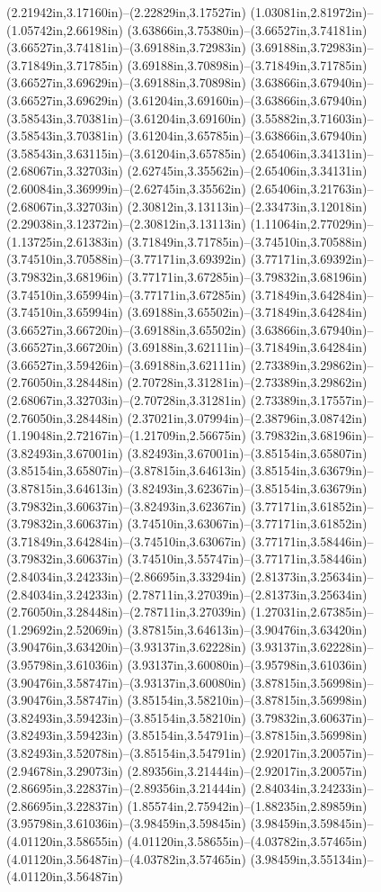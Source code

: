 (2.21942in,3.17160in)--(2.22829in,3.17527in) (1.03081in,2.81972in)--(1.05742in,2.66198in) (3.63866in,3.75380in)--(3.66527in,3.74181in) (3.66527in,3.74181in)--(3.69188in,3.72983in) (3.69188in,3.72983in)--(3.71849in,3.71785in) (3.69188in,3.70898in)--(3.71849in,3.71785in) (3.66527in,3.69629in)--(3.69188in,3.70898in) (3.63866in,3.67940in)--(3.66527in,3.69629in) (3.61204in,3.69160in)--(3.63866in,3.67940in) (3.58543in,3.70381in)--(3.61204in,3.69160in) (3.55882in,3.71603in)--(3.58543in,3.70381in) (3.61204in,3.65785in)--(3.63866in,3.67940in) (3.58543in,3.63115in)--(3.61204in,3.65785in) (2.65406in,3.34131in)--(2.68067in,3.32703in) (2.62745in,3.35562in)--(2.65406in,3.34131in) (2.60084in,3.36999in)--(2.62745in,3.35562in) (2.65406in,3.21763in)--(2.68067in,3.32703in) (2.30812in,3.13113in)--(2.33473in,3.12018in) (2.29038in,3.12372in)--(2.30812in,3.13113in) (1.11064in,2.77029in)--(1.13725in,2.61383in) (3.71849in,3.71785in)--(3.74510in,3.70588in) (3.74510in,3.70588in)--(3.77171in,3.69392in) (3.77171in,3.69392in)--(3.79832in,3.68196in) (3.77171in,3.67285in)--(3.79832in,3.68196in) (3.74510in,3.65994in)--(3.77171in,3.67285in) (3.71849in,3.64284in)--(3.74510in,3.65994in) (3.69188in,3.65502in)--(3.71849in,3.64284in) (3.66527in,3.66720in)--(3.69188in,3.65502in) (3.63866in,3.67940in)--(3.66527in,3.66720in) (3.69188in,3.62111in)--(3.71849in,3.64284in) (3.66527in,3.59426in)--(3.69188in,3.62111in) (2.73389in,3.29862in)--(2.76050in,3.28448in) (2.70728in,3.31281in)--(2.73389in,3.29862in) (2.68067in,3.32703in)--(2.70728in,3.31281in) (2.73389in,3.17557in)--(2.76050in,3.28448in) (2.37021in,3.07994in)--(2.38796in,3.08742in) (1.19048in,2.72167in)--(1.21709in,2.56675in) (3.79832in,3.68196in)--(3.82493in,3.67001in) (3.82493in,3.67001in)--(3.85154in,3.65807in) (3.85154in,3.65807in)--(3.87815in,3.64613in) (3.85154in,3.63679in)--(3.87815in,3.64613in) (3.82493in,3.62367in)--(3.85154in,3.63679in) (3.79832in,3.60637in)--(3.82493in,3.62367in) (3.77171in,3.61852in)--(3.79832in,3.60637in) (3.74510in,3.63067in)--(3.77171in,3.61852in) (3.71849in,3.64284in)--(3.74510in,3.63067in) (3.77171in,3.58446in)--(3.79832in,3.60637in) (3.74510in,3.55747in)--(3.77171in,3.58446in) (2.84034in,3.24233in)--(2.86695in,3.33294in) (2.81373in,3.25634in)--(2.84034in,3.24233in) (2.78711in,3.27039in)--(2.81373in,3.25634in) (2.76050in,3.28448in)--(2.78711in,3.27039in) (1.27031in,2.67385in)--(1.29692in,2.52069in) (3.87815in,3.64613in)--(3.90476in,3.63420in) (3.90476in,3.63420in)--(3.93137in,3.62228in) (3.93137in,3.62228in)--(3.95798in,3.61036in) (3.93137in,3.60080in)--(3.95798in,3.61036in) (3.90476in,3.58747in)--(3.93137in,3.60080in) (3.87815in,3.56998in)--(3.90476in,3.58747in) (3.85154in,3.58210in)--(3.87815in,3.56998in) (3.82493in,3.59423in)--(3.85154in,3.58210in) (3.79832in,3.60637in)--(3.82493in,3.59423in) (3.85154in,3.54791in)--(3.87815in,3.56998in) (3.82493in,3.52078in)--(3.85154in,3.54791in) (2.92017in,3.20057in)--(2.94678in,3.29073in) (2.89356in,3.21444in)--(2.92017in,3.20057in) (2.86695in,3.22837in)--(2.89356in,3.21444in) (2.84034in,3.24233in)--(2.86695in,3.22837in) (1.85574in,2.75942in)--(1.88235in,2.89859in) (3.95798in,3.61036in)--(3.98459in,3.59845in) (3.98459in,3.59845in)--(4.01120in,3.58655in) (4.01120in,3.58655in)--(4.03782in,3.57465in) (4.01120in,3.56487in)--(4.03782in,3.57465in) (3.98459in,3.55134in)--(4.01120in,3.56487in) 